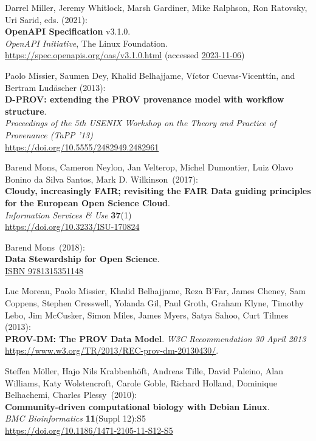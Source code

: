 \begin{thebibliography}{9}
Darrel Miller, Jeremy Whitlock, Marsh Gardiner, Mike Ralphson, Ron
Ratovsky, Uri Sarid, eds. (2021): \\
\textbf{OpenAPI Specification} v3.1.0.\\
\emph{OpenAPI Initiative}, The Linux Foundation.\\
\url{https://spec.openapis.org/oas/v3.1.0.html} 
(accessed \href{https://web.archive.org/web/20231106014946/https://spec.openapis.org/oas/v3.1.0.html}{2023-11-06})

Paolo Missier, Saumen Dey, Khalid Belhajjame, Víctor Cuevas-Vicenttín, and Bertram Ludäscher (2013):\\
\textbf{D-PROV: extending the PROV provenance model with workflow structure}.\\
\emph{Proceedings of the 5th USENIX Workshop on the Theory and Practice of Provenance (TaPP '13)}\\
\url{https://doi.org/10.5555/2482949.2482961}

Barend Mons, Cameron Neylon, Jan Velterop, Michel
Dumontier, Luiz Olavo Bonino da Silva Santos, Mark D. Wilkinson~(2017):\\
\textbf{Cloudy, increasingly FAIR; revisiting the FAIR Data guiding
principles for the European Open Science Cloud}.\\
\emph{Information Services \& Use} \textbf{37}(1)\\
\url{https://doi.org/10.3233/ISU-170824}

Barend Mons~(2018):\\
\textbf{Data Stewardship for Open Science}.\\
\href{https://identifiers.org/isbn/9781315351148}{ISBN 9781315351148}

Luc Moreau, Paolo Missier, Khalid Belhajjame, Reza B'Far, James Cheney, Sam Coppens, Stephen Cresswell, Yolanda Gil, Paul Groth, Graham Klyne, Timothy Lebo, Jim McCusker, Simon Miles, James Myers, Satya Sahoo, Curt Tilmes (2013):\\
\textbf{PROV-DM: The PROV Data Model}.
\emph{W3C Recommendation 30 April 2013}\\
\url{https://www.w3.org/TR/2013/REC-prov-dm-20130430/}.

Steffen Möller, Hajo Nils Krabbenhöft, Andreas Tille, David
Paleino, Alan Williams, Katy Wolstencroft, Carole Goble, Richard
Holland, Dominique Belhachemi, Charles Plessy~(2010):\\
\textbf{Community-driven computational biology with Debian Linux}.\\
\emph{BMC Bioinformatics} \textbf{11}(Suppl 12):S5\\
\url{https://doi.org/10.1186/1471-2105-11-S12-S5}


\end{thebibliography}
